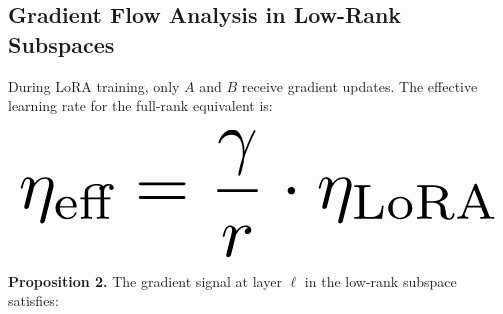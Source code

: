 \documentclass[11pt,a4paper]{article}
\begin{document}
\subsection{Gradient Flow Analysis in Low-Rank Subspaces}


During LoRA training, only $A$ and $B$ receive gradient updates. The effective learning rate for the full-rank equivalent is:



























\begin{equation}
\resizebox{\columnwidth}{!}{$\displaystyle
\begin{aligned}
\eta_{\text{eff}} = \frac{\gamma}{r} \cdot \eta_{\text{LoRA}}
\end{aligned}
$}
\end{equation}



























\textbf{Proposition 2.} The gradient signal at layer $\ell$ in the low-rank subspace satisfies:
\end{document}
